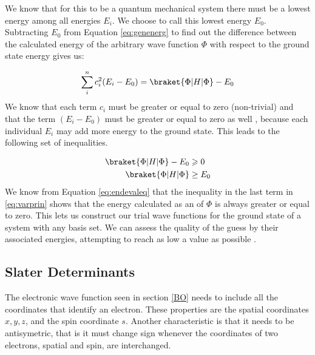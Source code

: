 \documentclass[../master_thesis.tex]{subfiles}
\begin{document}
We know that for this to be a quantum mechanical system there must be a lowest
energy among all energies $E_i$. We choose to call this lowest energy $E_0$.
Subtracting $E_0$ from Equation \ref{eq:genenerg} to find out the difference
between the calculated energy of the arbitrary wave function $\Phi$ with respect
to the ground state energy gives us:

\begin{equation}
   \sum\limits_i^nc_i^2(E_i - E_0) = \braket{\Phi | H | \Phi} - E_0
\end{equation}
We know that each term $c_i$ must be greater or equal to zero (non-trivial) and
that the term $(E_i - E_0)$ must be greater or equal to zero as well
\cite{Cramer:2004}, because each individual $E_i$ may add more energy to the
ground state. This leads to the following set of inequalities.

\begin{equation}
  \begin{split} \label{eq:varprin}
    \braket{\Phi | H | \Phi} - E_0 & \geqslant 0 \\
    \braket{\Phi | H | \Phi} & \geq E_0
  \end{split}
\end{equation}
We know from Equation \ref{eq:endevaleq} that the inequality in the last term in
\ref{eq:varprin} shows that the energy calculated as an \eival of $\Phi$ is
always greater or equal to zero. This lets us construct our trial wave functions
for the ground state of a system with any basis set. We can assess the quality
of the guess by their associated energies, attempting to reach as low a value
as possible \cite{Cramer:2004}.

\subsection{Slater Determinants}
The electronic wave function seen in section \ref{BO} needs to include all the
coordinates that identify an electron. These properties are the spatial coordinates
$x, y, z$, and the spin coordinate $s$. Another characteristic is that
it needs to be antisymetric, that is it must change sign whenever the coordinates
of two electrons, spatial and spin, are interchanged\cite{}.
\end{document}

